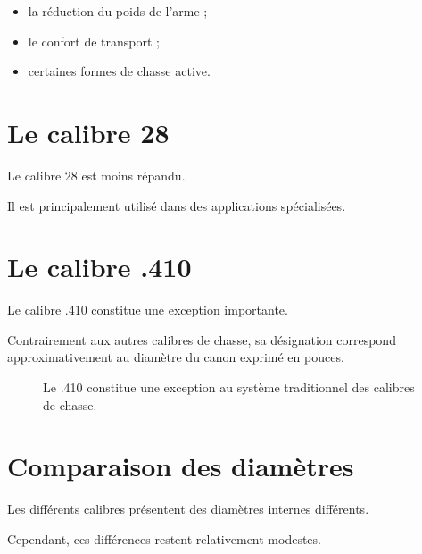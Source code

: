 \begin{itemize}
    \item la réduction du poids de l'arme ;
    \item le confort de transport ;
    \item certaines formes de chasse active.
\end{itemize}

\section{Le calibre 28}

Le calibre 28 est moins répandu.

Il est principalement utilisé dans des applications spécialisées.

\section{Le calibre .410}

Le calibre .410 constitue une exception importante.

Contrairement aux autres calibres de chasse, sa désignation correspond
approximativement au diamètre du canon exprimé en pouces.

\begin{figure}[htbp]
\centering


\caption{Le .410 constitue une exception au système traditionnel des calibres de chasse.}
\label{fig:cas_410}

\end{figure}

\section{Comparaison des diamètres}

Les différents calibres présentent des diamètres internes différents.

Cependant, ces différences restent relativement modestes.


